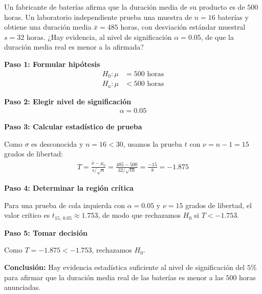 \begin{ejemplo}
	\label{exmp:6.4.1}
	Un fabricante de baterías afirma que la duración media de su producto es de $500$ horas. Un laboratorio independiente prueba una muestra de $n=16$ baterías y obtiene una duración media $\bar{x} = 485$ horas, con desviación estándar muestral $s = 32$ horas. ¿Hay evidencia, al nivel de significación $\alpha = 0.05$, de que la duración media real es menor a la afirmada?
\end{ejemplo}

\begin{solucion}
	\textbf{Paso 1: Formular hipótesis}
	\begin{align}
		H_0: \mu &= 500 \text{ horas} \\
		H_a: \mu &< 500 \text{ horas}
	\end{align}

	\textbf{Paso 2: Elegir nivel de significación}
	\begin{align}
		\alpha = 0.05
	\end{align}

	\textbf{Paso 3: Calcular estadístico de prueba}

	Como $\sigma$ es desconocida y $n=16 < 30$, usamos la prueba $t$ con $\nu = n-1 = 15$ grados de libertad:
	\begin{align}
		T = \frac{\bar{x} - \mu_0}{s/\sqrt{n}} = \frac{485 - 500}{32/\sqrt{16}} = \frac{-15}{8} = -1.875
	\end{align}

	\textbf{Paso 4: Determinar la región crítica}

	Para una prueba de cola izquierda con $\alpha = 0.05$ y $\nu = 15$ grados de libertad, el valor crítico es $t_{15,\,0.05} \approx 1.753$, de modo que rechazamos $H_0$ si $T < -1.753$.

	\textbf{Paso 5: Tomar decisión}

	Como $T = -1.875 < -1.753$, rechazamos $H_0$.

	\textbf{Conclusión:} Hay evidencia estadística suficiente al nivel de significación del $5\%$ para afirmar que la duración media real de las baterías es menor a las $500$ horas anunciadas.
\end{solucion}
